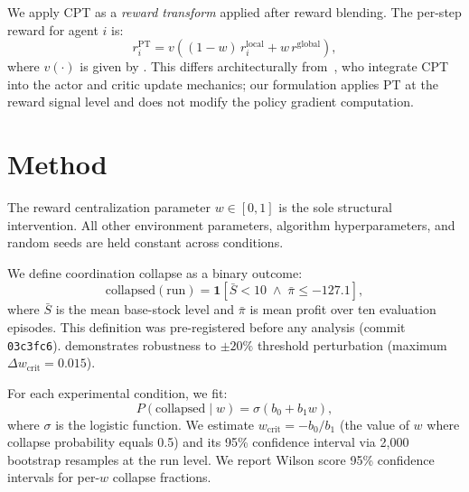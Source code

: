 \documentclass[11pt]{article}
\newcommand{\wcrit}{w_{\mathrm{crit}}}
\newcommand{\PT}{\mathrm{PT}}
\begin{document}
We apply CPT as a \emph{reward transform} applied after reward blending.
The per-step reward for agent $i$ is:
\begin{equation}
  r_i^{\PT} = v\!\left((1-w)\,r_i^{\mathrm{local}} + w\,r^{\mathrm{global}}\right),
  \label{eq:reward}
\end{equation}
where $v(\cdot)$ is given by .
This differs architecturally from~\citet{lalmohammed2025}, who integrate
CPT into the actor and critic update mechanics; our formulation applies PT
at the reward signal level and does not modify the policy gradient
computation.

\section{Method}
\label{sec:method}

The reward centralization parameter $w \in [0,1]$ is the sole structural
intervention.
All other environment parameters, algorithm hyperparameters, and random
seeds are held constant across conditions.

We define coordination collapse as a binary outcome:
\begin{equation}
  \mathrm{collapsed}(\text{run}) = \mathbf{1}\!\left[
    \bar{S} < 10 \;\wedge\; \bar{\pi} \leq -127.1
  \right],
  \label{eq:collapse}
\end{equation}
where $\bar{S}$ is the mean base-stock level and $\bar{\pi}$ is mean
profit over ten evaluation episodes.
This definition was pre-registered before any analysis (commit
\texttt{03c3fc6}).
 demonstrates robustness to $\pm 20\%$
threshold perturbation (maximum $\Delta\wcrit = 0.015$).

For each experimental condition, we fit:
\begin{equation}
  P(\mathrm{collapsed} \mid w) = \sigma(b_0 + b_1 w),
  \label{eq:logistic}
\end{equation}
where $\sigma$ is the logistic function.
We estimate $\wcrit = -b_0/b_1$ (the value of $w$ where collapse
probability equals 0.5) and its 95\% confidence interval via 2,000
bootstrap resamples at the run level.
We report Wilson score 95\% confidence intervals for per-$w$ collapse
fractions.
\end{document}
